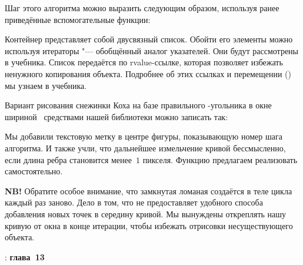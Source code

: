 Шаг этого алгоритма можно выразить следующим образом, используя ранее приведённые вспомогательные функции:


Контейнер  представляет собой двусвязный список. Обойти его элементы можно используя итераторы "--- обобщённый аналог указателей. Они будут рассмотрены в  учебника. Список передаётся по rvalue-ссылке, которая позволяет избежать ненужного копирования объекта. Подробнее об этих ссылках и перемещении () мы узнаем в  учебника.

Вариант рисования снежинки Коха на базе правильного -угольника в окне шириной~ средствами нашей библиотеки  можно записать так:


Мы добавили текстовую метку в центре фигуры, показывающую номер шага алгоритма. И также учли, что дальнейшее измельчение кривой бессмысленно, если длина ребра становится менее~\(1\) пикселя. Функцию  предлагаем реализовать самостоятельно.

\textbf{NB!} Обратите особое внимание, что замкнутая ломаная создаётся в теле цикла каждый раз заново. Дело в том, что  не предоставляет удобного способа добавления новых точек в середину кривой. Мы вынуждены откреплять нашу кривую от окна в конце итерации, чтобы избежать отрисовки несуществующего объекта.






\WhatToReadSection
\textcite{Stroustrup:2016:ru}: \textbf{глава~13}



